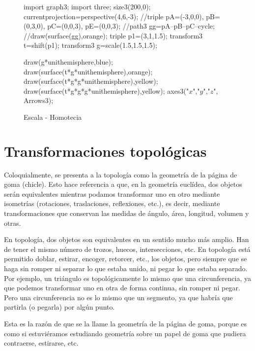 \begin{figure}[!ht]
	\centering
	\begin{asy}
	import graph3;
	import three;
	size3(200,0);
	currentprojection=perspective(4,6,-3);
	//triple pA=(-3,0,0), pB=(0,3,0), pC=(0,0,3), pE=(0,0,3);
	//path3 gg=pA--pB--pC--cycle;
	//draw(surface(gg),orange);
	triple p1=(3,1,1.5);
	transform3 t=shift(p1);
	transform3 g=scale(1.5,1.5,1.5);

	draw(g*unithemisphere,blue);
	draw(surface(t*g*unithemisphere),orange);
	draw(surface(t*g*g*unithemisphere),yellow);
	draw(surface(t*g*g*g*unithemisphere),yellow);
	axes3("$x$","$y$","$z$", Arrows3);
	\end{asy}
	\caption{Escala - Homotecia}
\end{figure}



\section{Transformaciones topológicas}
Coloquialmente, se presenta a la topología como la geometría de la página de goma (chicle). Esto hace referencia a que, en la geometría euclídea, dos objetos serán equivalentes mientras podamos transformar uno en otro mediante isometrías (rotaciones, traslaciones, reflexiones, etc.), es decir, mediante transformaciones que conservan las medidas de ángulo, área, longitud, volumen y otras.

En topología, dos objetos son equivalentes en un sentido mucho más amplio. Han de tener el mismo número de trozos, huecos, intersecciones, etc. En topología está permitido doblar, estirar, encoger, retorcer, etc., los objetos, pero siempre que se haga sin romper ni separar lo que estaba unido, ni pegar lo que estaba separado. Por ejemplo, un triángulo es topológicamente lo mismo que una circunferencia, ya que podemos transformar uno en otra de forma continua, sin romper ni pegar. Pero una circunferencia no es lo mismo que un segmento, ya que habría que partirla (o pegarla) por algún punto.

Esta es la razón de que se la llame la geometría de la página de goma, porque es como si estuviéramos estudiando geometría sobre un papel de goma que pudiera contraerse, estirarse, etc.


